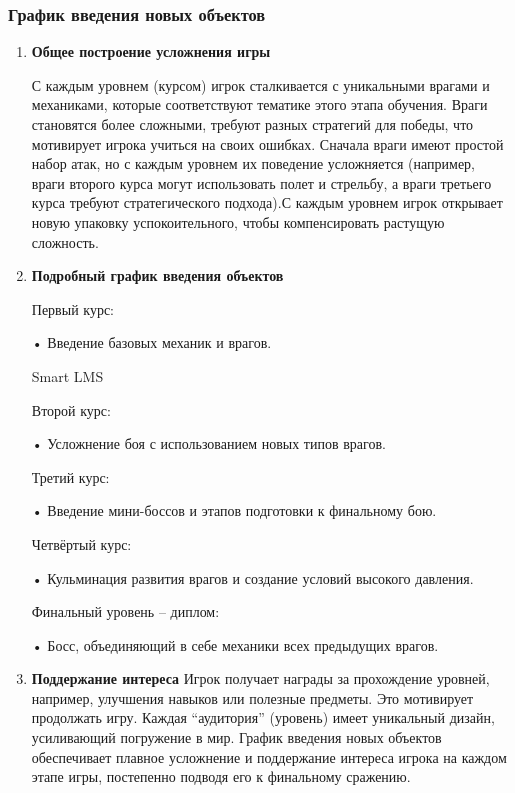 \documentclass{article}
\begin{document}
\subsubsection{График введения новых объектов}
    \begin{enumerate}
    \item \textbf{Общее построение усложнения игры} \par
    С каждым уровнем (курсом) игрок сталкивается с уникальными врагами и механиками, которые соответствуют тематике этого этапа обучения. Враги становятся более сложными, требуют разных стратегий для победы, что мотивирует игрока учиться на своих ошибках. Сначала враги имеют простой набор атак, но с каждым уровнем их поведение усложняется (например, враги второго курса могут использовать полет и стрельбу, а враги третьего курса требуют стратегического подхода).С каждым уровнем игрок открывает новую упаковку успокоительного, чтобы компенсировать растущую сложность.
    \item\textbf{Подробный график введения объектов} \par
    Первый курс: \par
    • Введение базовых механик и врагов. \par Smart LMS \par
    Второй курс: \par
    • Усложнение боя с использованием новых типов врагов. \par
    Третий курс: \par
    • Введение мини-боссов и этапов подготовки к финальному бою. \par
    Четвёртый курс: \par
    • Кульминация развития врагов и создание условий высокого давления. \par
    Финальный уровень – диплом: \par
    • Босс, объединяющий в себе механики всех предыдущих врагов. \par
    \item\textbf{Поддержание интереса}
    Игрок получает награды за прохождение уровней, например, улучшения навыков или полезные предметы. Это мотивирует продолжать игру. Каждая “аудитория” (уровень) имеет уникальный дизайн, усиливающий погружение в мир. График введения новых объектов обеспечивает плавное усложнение и поддержание интереса игрока на каждом этапе игры, постепенно подводя его к финальному сражению.
    \end{enumerate}
\end{document}
